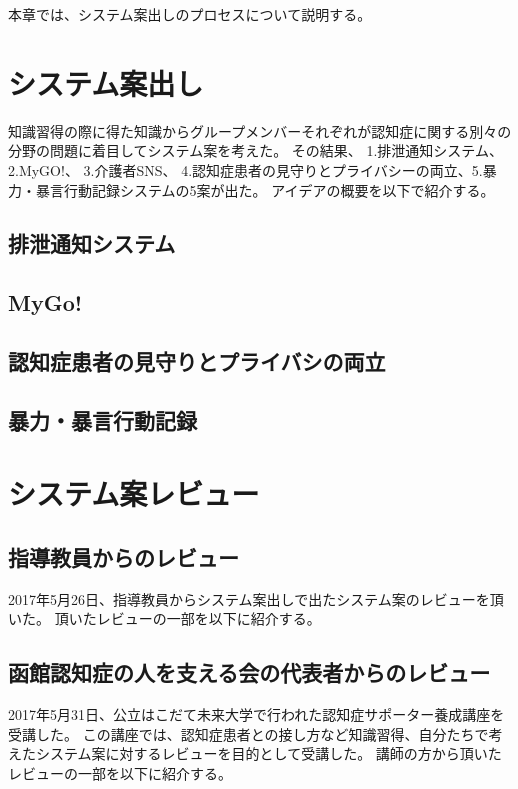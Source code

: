 \documentclass[../report]{subfiles}
\begin{document}
本章では、システム案出しのプロセスについて説明する。

\section{システム案出し}
知識習得の際に得た知識からグループメンバーそれぞれが認知症に関する別々の分野の問題に着目してシステム案を考えた。
その結果、 1.排泄通知システム、 2.MyGO!、 3.介護者SNS、 4.認知症患者の見守りとプライバシーの両立、5.暴力・暴言行動記録システムの5案が出た。
アイデアの概要を以下で紹介する。

\subsection{排泄通知システム}

\subsection{MyGo!}

\subsection{認知症患者の見守りとプライバシの両立}

\subsection{暴力・暴言行動記録}


\section{システム案レビュー}
\subsection{指導教員からのレビュー}
2017年5月26日、指導教員からシステム案出しで出たシステム案のレビューを頂いた。
頂いたレビューの一部を以下に紹介する。

\subsection{函館認知症の人を支える会の代表者からのレビュー}
2017年5月31日、公立はこだて未来大学で行われた認知症サポーター養成講座を受講した。
この講座では、認知症患者との接し方など知識習得、自分たちで考えたシステム案に対するレビューを目的として受講した。
講師の方から頂いたレビューの一部を以下に紹介する。
\end{document}
